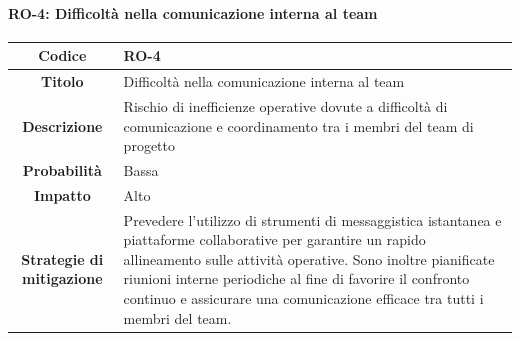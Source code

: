\documentclass[a4paper,12pt]{article}
\begin{document}
{{            \paragraph{RO-4: Difficoltà nella comunicazione interna al team}\mbox{}{     
                \begin{longtable}{|c|p{11cm}|}
                    \hline
                    \textbf{Codice} & RO-4 \\
                    \hline
                    \textbf{Titolo} & Difficoltà nella comunicazione interna al team \\
                    \hline
                    \textbf{Descrizione} & Rischio di inefficienze operative dovute a difficoltà di comunicazione e coordinamento tra i membri del team di progetto \\
                    \hline
                    \textbf{Probabilità} & Bassa \\
                    \hline
                    \textbf{Impatto} & Alto \\
                    \hline
                    \textbf{Strategie di mitigazione} & Prevedere l'utilizzo di strumenti di messaggistica istantanea e piattaforme collaborative per garantire un rapido allineamento sulle attività operative. Sono inoltre pianificate riunioni interne periodiche al fine di favorire il confronto continuo e assicurare una comunicazione efficace tra tutti i membri del team. \\
                    \hline
                \end{longtable}
            }

}}
\end{document}
